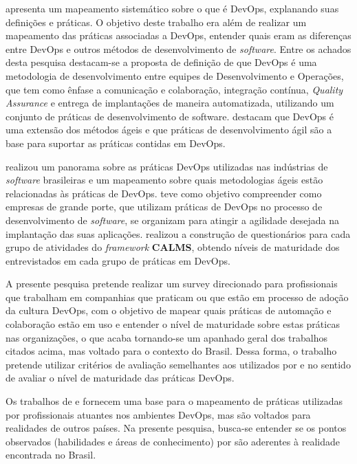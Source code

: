 \documentclass[twoside,english,brazilian]{UNISINOSartigo}
\begin{document}
 apresenta um mapeamento sistemático sobre o que é DevOps, explanando suas definições e práticas. O objetivo deste trabalho era além de realizar um mapeamento das práticas associadas a DevOps, entender quais eram as diferenças entre DevOps e outros métodos de desenvolvimento de \textit{software}. Entre os achados desta pesquisa destacam-se a proposta de definição de que DevOps é uma metodologia de desenvolvimento entre equipes de Desenvolvimento e Operações, que tem como ênfase a comunicação e colaboração, integração contínua, \textit{Quality Assurance} e entrega de implantações de maneira automatizada, utilizando um conjunto de práticas de desenvolvimento de software.  destacam que DevOps é uma extensão dos métodos ágeis e que práticas de desenvolvimento ágil são a base para suportar as práticas contidas em DevOps. 

 realizou um panorama sobre as práticas DevOps utilizadas nas indústrias de \textit{software} brasileiras e um mapeamento sobre quais metodologias ágeis estão relacionadas às práticas de DevOps. 
 teve como objetivo compreender como empresas de grande porte, que utilizam práticas de DevOps no processo de desenvolvimento de \textit{software}, se organizam para atingir a agilidade desejada na implantação das suas aplicações.  realizou a construção de questionários para cada grupo de atividades do \textit{framework} \textbf{CALMS}, obtendo níveis de maturidade dos entrevistados em cada grupo de práticas em DevOps.

A presente pesquisa pretende realizar um survey direcionado para profissionais que trabalham em companhias que praticam ou que estão em processo de adoção da cultura DevOps, com o objetivo de mapear quais práticas de automação e colaboração estão em uso e entender o nível de maturidade sobre estas práticas nas organizações, o que acaba tornando-se um apanhado geral dos trabalhos citados acima, mas voltado para o contexto do Brasil.
Dessa forma, o trabalho pretende utilizar critérios de avaliação semelhantes aos utilizados por  e  no sentido de avaliar o nível de maturidade das práticas DevOps.

Os trabalhos de  e  fornecem uma base para o mapeamento de práticas utilizadas por profissionais atuantes nos ambientes DevOps, mas são voltados para realidades de outros países. Na presente pesquisa, busca-se entender se os pontos observados (habilidades e áreas de conhecimento) por  são aderentes à realidade encontrada no Brasil.
\end{document}
